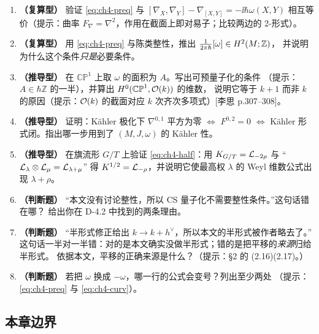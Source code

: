 \begin{enumerate}[leftmargin=2.2em]
\item \textbf{（复算型）} 验证 \eqref{eq:ch4-preq} 与 $[\nabla_X,\nabla_Y]-\nabla_{[X,Y]}=-\ii\hbar\omega(X,Y)$
相互等价（提示：曲率 $F_\nabla=\nabla^2$，作用在截面上即对易子；比较两边的 2-形式）。

\item \textbf{（复算型）} 用 \eqref{eq:ch4-preq} 与陈类整性，推出 $\frac{1}{2\pi\hbar}[\omega]\in H^2(M;\mathbb{Z})$，
并说明为什么这个条件\emph{只是}必要条件。

\item \textbf{（推导型）} 在 $\mathbb{CP}^1$ 上取 $\omega$ 的面积为 $A$。写出可预量子化的条件
（提示：$A\in\hbar\mathbb Z$ 的一半），并算出 $H^0(\mathbb{CP}^1,\mathcal{O}(k))$ 的维数，
说明它等于 $k+1$ 而非 $k$ 的原因（提示：$\mathcal{O}(k)$ 的截面对应 $k$ 次齐次多项式）[李思 p.307--308]。

\item \textbf{（推导型）} 证明：Kähler 极化下 $\nabla^{0,1}$ 平方为零 $\iff$ $F^{0,2}=0$ $\iff$
Kähler 形式闭。指出哪一步用到了 $(M,J,\omega)$ 的 Kähler 性。

\item \textbf{（推导型）} 在旗流形 $G/T$ 上验证 \eqref{eq:ch4-half}：用 $K_{G/T}=\mathcal{L}_{-2\rho}$ 与
“$\mathcal{L}_\lambda\otimes\mathcal{L}_\mu=\mathcal{L}_{\lambda+\mu}$” 得 $K^{1/2}=\mathcal{L}_{-\rho}$，并说明它使最高权
$\lambda$ 的 Weyl 维数公式出现 $\lambda+\rho$。

\item \textbf{（判断题）} “本文没有讨论整性，所以 CS 量子化不需要整性条件。”这句话错在哪？
给出你在 D-4.2 中找到的两条理由。

\item \textbf{（判断题）} “半形式修正给出 $k\to k+h^\vee$，所以本文的半形式被作者略去了。”
这句话一半对一半错：对的是本文确实没做半形式；错的是把平移的\emph{来源}归给半形式。
依据本文，平移的正确来源是什么？（提示：§2 的 (2.16)(2.17)。）

\item \textbf{（判断题）} 若把 $\omega$ 换成 $-\omega$，哪一行的公式会变号？列出至少两处
（提示：\eqref{eq:ch4-preq} 与 \eqref{eq:ch4-curv}）。
\end{enumerate}

\subsection{本章边界}

